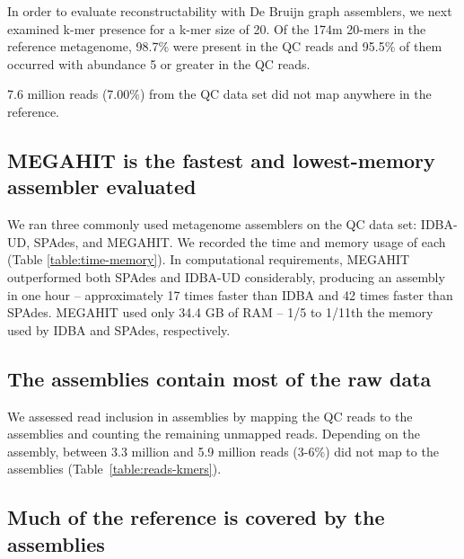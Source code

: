 \documentclass[10pt,a4paper,twocolumn]{article}
\begin{document}
In order to evaluate reconstructability with De Bruijn graph
assemblers, we next examined k-mer presence for a k-mer size of 20. Of
the 174m 20-mers in the reference metagenome, 98.7\% were present in the
QC reads and 95.5\% of them occurred with abundance 5 or greater in
the QC reads.


7.6 million reads (7.00\%) from the QC data set did not map anywhere in
the reference.

\subsection*{MEGAHIT is the fastest and lowest-memory assembler evaluated}

We ran three commonly used metagenome assemblers on the QC data set:
IDBA-UD, SPAdes, and MEGAHIT. We recorded the time and memory usage of
each (Table \ref{table:time-memory}).  In computational requirements, MEGAHIT outperformed both
SPAdes and IDBA-UD considerably, producing an assembly in one hour --
approximately 17 times faster than IDBA and 42 times faster than
SPAdes.  MEGAHIT used only 34.4 GB of RAM -- 1/5 to 1/11th
the memory used by IDBA and SPAdes, respectively.

\subsection*{The assemblies contain most of the raw data}

We assessed read inclusion in assemblies by mapping the QC reads to
the assemblies and counting the remaining unmapped reads. Depending on
the assembly, between 3.3 million and 5.9 million reads (3-6\%)
did not map to the assemblies (Table~\ref{table:reads-kmers}).

\subsection*{Much of the reference is covered by the assemblies}
\end{document}
